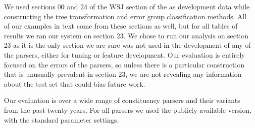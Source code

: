 We used sections 00 and 24 of the WSJ section of the \ptb as development data while constructing the tree transformation and error group classification methods.
All of our examples in text come from these sections as well, but for all tables of results we ran our system on section 23.
We chose to run our analysis on section 23 as it is the only section we are sure was not used in the development of any of the parsers, either for tuning or feature development.
Our evaluation is entirely focused on the errors of the parsers, so unless there is a particular construction that is unusually prevalent in section 23, we are not revealing any information about the test set that could bias future work.

Our evaluation is over a wide range of \ptb constituency parsers and their variants from the past twenty years.
For all parsers we used the publicly available version, with the standard parameter settings.

